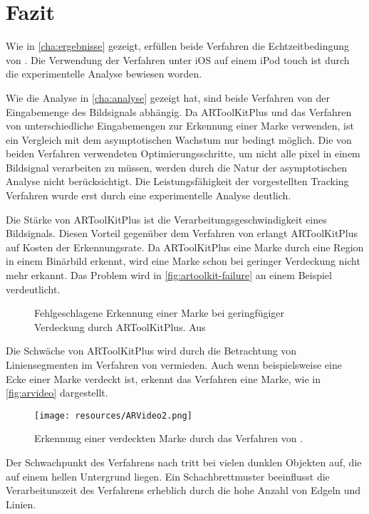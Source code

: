 \chapter{Fazit} %
\label{cha:fazit}

Wie in \autoref{cha:ergebnisse} gezeigt, erfüllen beide Verfahren die Echtzeitbedingung von \citeauthor{azuma97}. Die
 Verwendung der Verfahren unter iOS auf einem iPod touch ist durch die experimentelle Analyse bewiesen worden.

Wie die Analyse in \autoref{cha:analyse} gezeigt hat, sind beide Verfahren von der Eingabemenge des Bildsignals
 abhängig. Da ARToolKitPlus und das Verfahren von \citeauthor{hirzer08} unterschiedliche Eingabemengen zur Erkennung
 einer Marke verwenden, ist ein Vergleich mit dem asymptotischen Wachstum nur bedingt möglich. Die von beiden Verfahren
 verwendeten Optimierungsschritte, um nicht alle \gls{pixel} in einem Bildsignal verarbeiten zu müssen, werden durch
 die Natur der asymptotischen Analyse nicht berücksichtigt. Die Leistungsfähigkeit der vorgestellten Tracking Verfahren
 wurde erst durch eine experimentelle Analyse deutlich.

Die Stärke von ARToolKitPlus ist die Verarbeitungsgeschwindigkeit eines Bildsignals. Diesen Vorteil gegenüber dem
 Verfahren von \citeauthor{hirzer08} erlangt ARToolKitPlus auf Kosten der Erkennungsrate. Da ARToolKitPlus eine Marke
 durch eine Region in einem Binärbild erkennt, wird eine Marke schon bei geringer Verdeckung nicht mehr erkannt. Das
 Problem wird in \autoref{fig:artoolkit-failure} an einem Beispiel verdeutlicht.
\begin{figure}[!ht]
	\centering
	\caption{Fehlgeschlagene Erkennung einer Marke bei geringfügiger Verdeckung durch ARToolKitPlus. Aus
	 \cite{fiala2004artagb}}
	\label{fig:artoolkit-failure}
\end{figure}

Die Schwäche von ARToolKitPlus wird durch die Betrachtung von Liniensegmenten im Verfahren von \citeauthor{hirzer08}
 vermieden. Auch wenn beispielsweise eine Ecke einer Marke verdeckt ist, erkennt das Verfahren eine Marke, wie in
 \autoref{fig:arvideo} dargestellt.
\begin{figure}[!ht]
	\centering
	\texttt{[image: resources/ARVideo2.png]}
	\caption{Erkennung einer verdeckten Marke durch das Verfahren von \citeauthor{hirzer08}.}
	\label{fig:arvideo}
\end{figure}
Der Schwachpunkt des Verfahrens nach \citeauthor{hirzer08} tritt bei vielen dunklen Objekten auf, die auf einem hellen
 Untergrund liegen. Ein Schachbrettmuster beeinflusst die Verarbeitunszeit des Verfahrens erheblich durch die hohe
 Anzahl von Edgeln und Linien.


